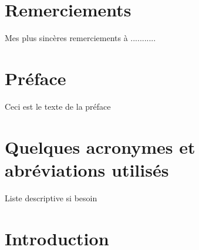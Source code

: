 \documentclass{FramateX}
\begin{document}
                        
                        
                       
                        
%
\cleardoublepage
{}

\chapter*{Remerciements}
%

Mes plus sincères remerciements à ...........

                        
                        
%

\cleardoublepage
{}
\chapter*{Préface}
%

                    

Ceci est le texte de la préface



%
\cleardoublepage
{}
\chapter*{Quelques acronymes et abréviations utilisés}
%

                    

Liste descriptive si besoin

                        
                        
%
\cleardoublepage
{}
\chapter*{Introduction}
\end{document}
